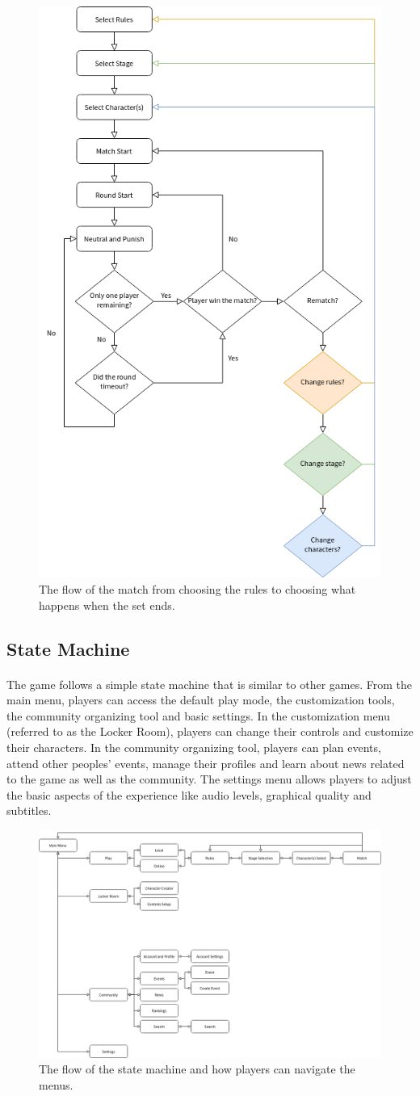 \begin{figure}[h!]
    \centering
    \includegraphics[width=0.5\linewidth]{images/flow-match.png}
    \caption{The flow of the match from choosing the rules to choosing what happens when the set ends.}
\end{figure}

\subsection{State Machine}

\paragraph{} The game follows a simple state machine that is similar to other games. From the main menu, players can access the default play mode, the customization tools, the community organizing tool and basic settings. In the customization menu (referred to as the Locker Room), players can change their controls and customize their characters. In the community organizing tool, players can plan events, attend other peoples' events, manage their profiles and learn about news related to the game as well as the community. The settings menu allows players to adjust the basic aspects of the experience like audio levels, graphical quality and subtitles.

\begin{figure}[h!]
    \centering
    \includegraphics[width=0.75\linewidth]{images/flow-menu.png}
    \caption{The flow of the state machine and how players can navigate the menus.}
\end{figure}